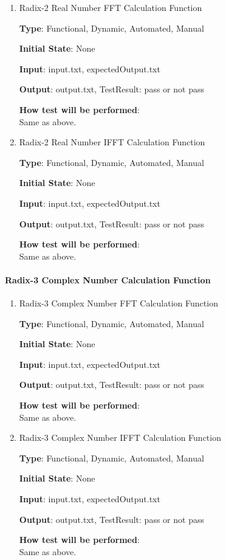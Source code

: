 \documentclass[12pt, titlepage]{article}
\begin{document}
\begin{enumerate}

\item{Radix-2 Real Number FFT Calculation Function\\}

\textbf {Type}: Functional, Dynamic, Automated, Manual
					
\textbf {Initial State}: None
					
\textbf {Input}: input.txt, expectedOutput.txt
					
\textbf {Output}:  output.txt, TestResult: pass or not pass
					
\textbf {How test will be performed}: \\
Same as above.

\item{Radix-2 Real Number IFFT Calculation Function\\}

\textbf {Type}: Functional, Dynamic, Automated, Manual
					
\textbf {Initial State}: None
					
\textbf {Input}: input.txt, expectedOutput.txt
					
\textbf {Output}:  output.txt, TestResult: pass or not pass

\textbf {How test will be performed}: \\
Same as above.
\end{enumerate}

\paragraph{Radix-3 Complex Number Calculation Function\\}

\begin{enumerate}

\item{Radix-3 Complex Number FFT Calculation Function\\}

\textbf {Type}: Functional, Dynamic, Automated, Manual
					
\textbf {Initial State}: None
					
\textbf {Input}: input.txt, expectedOutput.txt
					
\textbf {Output}:  output.txt, TestResult: pass or not pass
					
\textbf {How test will be performed}: \\
Same as above.

\item{Radix-3 Complex Number IFFT Calculation Function\\}

\textbf {Type}: Functional, Dynamic, Automated, Manual
					
\textbf {Initial State}: None
					
\textbf {Input}: input.txt, expectedOutput.txt
					
\textbf {Output}:  output.txt, TestResult: pass or not pass

\textbf {How test will be performed}: \\
Same as above.
\end{enumerate}
\end{document}

